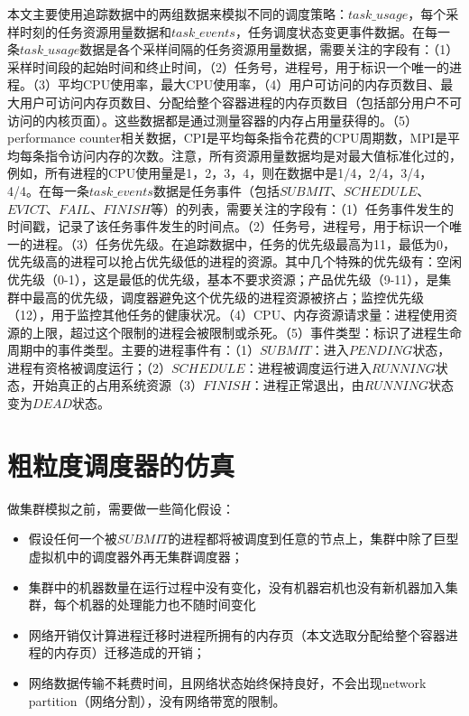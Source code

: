 本文主要使用追踪数据中的两组数据来模拟不同的调度策略：$task\_usage$，每个采样时刻的任务资源用量数据和$task\_events$，任务调度状态变更事件数据。在每一条$task\_usage$数据是各个采样间隔的任务资源用量数据，需要关注的字段有：（1）采样时间段的起始时间和终止时间，（2）任务号，进程号，用于标识一个唯一的进程。（3）平均CPU使用率，最大CPU使用率，（4）用户可访问的内存页数目、最大用户可访问内存页数目、分配给整个容器进程的内存页数目（包括部分用户不可访问的内核页面）。这些数据都是通过测量容器的内存占用量获得的。（5）performance counter相关数据，CPI是平均每条指令花费的CPU周期数，MPI是平均每条指令访问内存的次数。注意，所有资源用量数据均是对最大值标准化过的，例如，所有进程的CPU使用量是1，2，3，4，则在数据中是1/4，2/4，3/4，4/4。在每一条$task\_events$数据是任务事件（包括$SUBMIT$、$SCHEDULE$、$EVICT$、$FAIL$、$FINISH$等）的列表，需要关注的字段有：（1）任务事件发生的时间戳，记录了该任务事件发生的时间点。（2）任务号，进程号，用于标识一个唯一的进程。（3）任务优先级。在追踪数据中，任务的优先级最高为11，最低为0，优先级高的进程可以抢占优先级低的进程的资源。其中几个特殊的优先级有：空闲优先级（0-1），这是最低的优先级，基本不要求资源；产品优先级（9-11），是集群中最高的优先级，调度器避免这个优先级的进程资源被挤占；监控优先级（12），用于监控其他任务的健康状况。（4）CPU、内存资源请求量：进程使用资源的上限，超过这个限制的进程会被限制或杀死。（5）事件类型：标识了进程生命周期中的事件类型。主要的进程事件有：（1）$SUBMIT$：进入$PENDING$状态，进程有资格被调度运行；（2）$SCHEDULE$：进程被调度运行进入$RUNNING$状态，开始真正的占用系统资源（3）$FINISH$：进程正常退出，由$RUNNING$状态变为$DEAD$状态。

\section{粗粒度调度器的仿真}
做集群模拟之前，需要做一些简化假设：
\begin{itemize}
  \item 假设任何一个被$SUBMIT$的进程都将被调度到任意的节点上，集群中除了巨型虚拟机中的调度器外再无集群调度器；
  \item 集群中的机器数量在运行过程中没有变化，没有机器宕机也没有新机器加入集群，每个机器的处理能力也不随时间变化
  \item 网络开销仅计算进程迁移时进程所拥有的内存页（本文选取分配给整个容器进程的内存页）迁移造成的开销；
  \item 网络数据传输不耗费时间，且网络状态始终保持良好，不会出现network partition（网络分割），没有网络带宽的限制。

\end{itemize}

